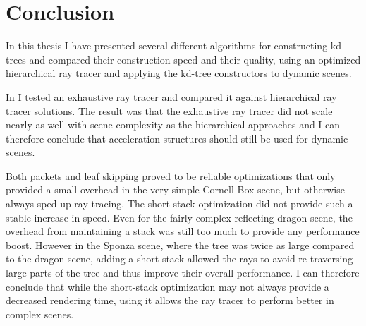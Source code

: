 




\chapter{Conclusion}


In this thesis I have presented several different algorithms for constructing
kd-trees and compared their construction speed and their quality, using an
optimized hierarchical ray tracer and applying the kd-tree constructors to
dynamic scenes.



In  I tested an exhaustive ray tracer and compared it
against hierarchical ray tracer solutions. The result was that the exhaustive
ray tracer did not scale nearly as well with scene complexity as the
hierarchical approaches and I can therefore conclude that acceleration
structures should still be used for dynamic scenes.


Both packets and leaf skipping proved to be reliable optimizations that only
provided a small overhead in the very simple Cornell Box scene, but otherwise
always sped up ray tracing. The short-stack optimization did not provide such a
stable increase in speed. Even for the fairly complex reflecting dragon scene,
the overhead from maintaining a stack was still too much to provide any
performance boost. However in the Sponza scene, where the tree was twice as
large compared to the dragon scene, adding a short-stack allowed the rays to
avoid re-traversing large parts of the tree and thus improve their overall
performance. I can therefore conclude that while the short-stack optimization may
not always provide a decreased rendering time, using it allows the ray tracer to
perform better in complex scenes.


